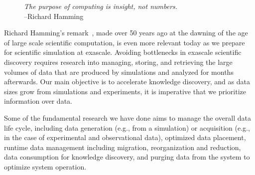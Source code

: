 

\begin{figure}
\vspace{-15pt}
\begin{tcolorbox}[width=2.85in]
 \begin{center}
    {\em The purpose of computing is insight, not numbers.} \\ --Richard Hamming
 \end{center}
\end{tcolorbox}
\end{figure}
 
 Richard Hamming's remark~\cite{Hamming:book}, made over 50 years ago at the dawning of the age of large scale scientific computation, is even more relevant today as we prepare for scientific simulation at exascale. Avoiding bottlenecks in exascale scientific discovery requires
research into managing, storing, and retrieving the large volumes of data that are
produced by simulations and analyzed for months afterwards. Our main objective is to accelerate knowledge discovery, and as data sizes grow from 
simulations and experiments, it is imperative that we prioritize information over
data.  

Some of the fundamental research we have done aims to manage the overall data life cycle, including data generation (e.g., from a simulation) or acquisition (e.g., in the case of experimental and observational data), optimized data placement, runtime data management including migration, reorganization and reduction, data consumption for knowledge discovery, and purging data from the system to optimize system operation. 


